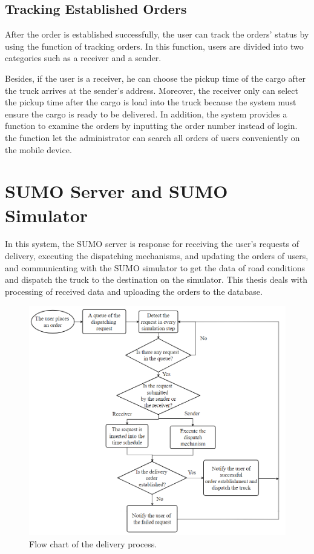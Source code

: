 \documentclass[12pt]{ksthesis}
\begin{document}
\begin{thesis}
{\subsection{Tracking Established Orders}
After the order is established successfully, the user can track the orders’ status by using the function of tracking orders. In this function, users are divided into two categories such as a receiver and a sender.

Besides, if the user is a receiver, he can choose the pickup time of the cargo after the truck arrives at the sender’s address.  
Moreover, the receiver only can select the pickup time after the cargo is load into the truck because the system must ensure the cargo is ready to be delivered. 
In addition, the system provides a function to examine the orders by inputting the order number instead of login. the function let the administrator can search all orders of users conveniently on the mobile device.

\section{SUMO Server and SUMO Simulator}
In this system, the SUMO server is response for receiving the user’s requests of delivery, executing the dispatching mechanisms, and updating the orders of users, and communicating with the SUMO simulator to get the data of road conditions and dispatch the truck to the destination on the simulator. This thesis deals with processing of received data and uploading the orders to the database.

\begin{figure}[H]
\centering
\includegraphics[width=1.0\textwidth]{./figures/F3-2_Flowchart.PNG}
\caption{\large Flow chart of the delivery process.}
\vspace{0.5cm}
\label{Fig:flow_chart}
\end{figure}




}
\end{thesis}
\end{document}

